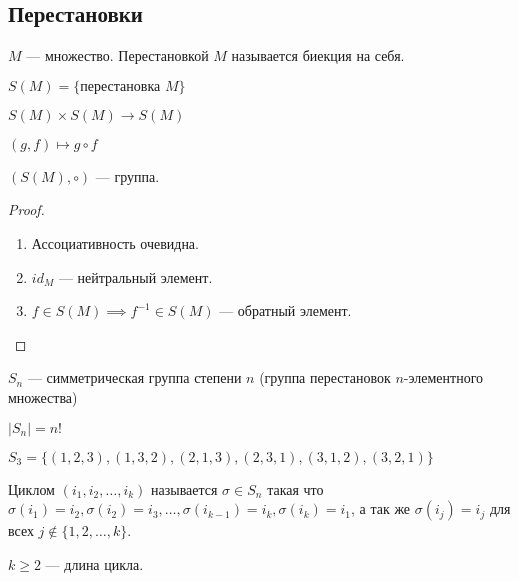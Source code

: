 \subsection{Перестановки}

\begin{defn}
    $M$ --- множество. Перестановкой $M$ называется биекция на себя.

    $S(M) = \{ \text{перестановка } M \}$

    $S(M) \times S(M) \to S(M)$

    $(g, f) \mapsto g \circ f$
\end{defn}

\begin{theorem-non}
    $(S(M), \circ)$ --- группа.
\end{theorem-non}

\begin{proof}
    \begin{enumerate}
        \item Ассоциативность очевидна.
        
        \item $id_M$ --- нейтральный элемент.
        
        \item $f \in S(M) \implies f^{-1} \in S(M)$ --- обратный элемент.
    \end{enumerate}
\end{proof}

\begin{defn}
    $S_n$ --- симметрическая группа степени $n$ (группа перестановок $n$-элементного множества)
\end{defn}

\begin{notice}
    $|S_n| = n!$
\end{notice}

\begin{example}
    $S_3 = \{ (1, 2, 3), (1, 3, 2), (2, 1, 3), (2, 3, 1), (3, 1, 2), (3, 2, 1) \}$
\end{example}

\begin{defn}
    Циклом $(i_1, i_2, \ldots, i_k)$ называется $\sigma \in S_n$ такая что $\sigma(i_1) = i_2, \sigma(i_2) = i_3, \ldots, \sigma(i_{k - 1}) = i_k, \sigma(i_k) = i_1$, а так же $\sigma(i_j) = i_j$ для всех $j \notin \{ 1, 2, \ldots, k \}$.

    $k \geq 2$ --- длина цикла.
\end{defn}

